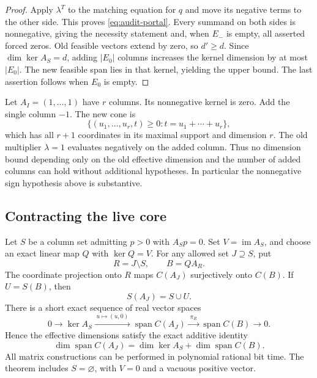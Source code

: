 \begin{proof}
Apply $\lambda^T$ to the matching equation for $q$ and move its negative
terms to the other side.  This proves \eqref{eq:audit-portal}.
Every summand on both sides is nonnegative, giving the necessity
statement and, when $E_-$ is empty, all asserted forced zeros.
Old feasible vectors extend by zero, so $d'\geq d$.  Since
$\dim\ker A_S=d$, adding $|E_0|$ columns increases the kernel dimension
by at most $|E_0|$.  The new feasible span lies in that kernel, yielding
the upper bound.  The last assertion follows when $E_0$ is empty.
\end{proof}

\begin{example}
Let $A_I=(1,\ldots,1)$ have $r$ columns.  Its nonnegative kernel is
zero.  Add the single column $-1$.  The new cone is
\[
 \{(u_1,\ldots,u_r,t)\geq0:t=u_1+\cdots+u_r\},
\]
which has all $r+1$ coordinates in its maximal support and dimension
$r$.  The old multiplier $\lambda=1$ evaluates negatively on the added
column.  Thus no dimension bound depending only on the old effective
dimension and the number of added columns can hold without additional
hypotheses.  In particular the nonnegative sign hypothesis above is
substantive.
\end{example}

\subsection{Contracting the live core}

\begin{theorem}
Let $S$ be a column set admitting $p>0$ with $A_Sp=0$.  Set
$V=\operatorname{im}A_S$, and choose an exact linear map $Q$ with
$\ker Q=V$.  For any allowed set $J\supseteq S$, put
\[
 R=J\setminus S,\qquad B=QA_R.
\]
The coordinate projection onto $R$ maps $C(A_J)$ surjectively onto
$C(B)$.  If $U=S(B)$, then
\[
 S(A_J)=S\cup U.
\]
There is a short exact sequence of real vector spaces
\[
 0\longrightarrow\ker A_S
   \xrightarrow{\;u\mapsto(u,0)\;}
   \operatorname{span}C(A_J)
   \xrightarrow{\;\pi_R\;}
   \operatorname{span}C(B)
   \longrightarrow0.
\]
Hence the effective dimensions satisfy the exact additive identity
\[
 \dim\operatorname{span}C(A_J)
       =\dim\ker A_S+\dim\operatorname{span}C(B).
\]
All matrix constructions can be performed in polynomial rational bit
time.  The theorem includes $S=\varnothing$, with $V=0$ and a vacuous
positive vector.
\end{theorem}

